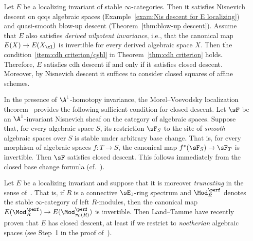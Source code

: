 \begin{exam}\label{exam:cdh=localizing+nil+closed}
Let $E$ be a localizing invariant of stable $\infty$-categories. Then it satisfies Nisnevich descent on qcqs algebraic spaces (Example~\ref{exam:Nis descent for E localizing}) and quasi-smooth blow-up descent (Theorem~\ref{thm:blow-up descent}). Assume that $E$ also satisfies \emph{derived nilpotent invariance}, i.e., that the canonical map $E(X) \to E(X_\cl)$ is invertible for every derived algebraic space $X$. Then the condition~\eqref{item:cdh criterion/qsbl} in Theorem~\ref{thm:cdh criterion} holds. Therefore, $E$ satisfies cdh descent if and only if it satisfies closed descent. Moreover, by Nisnevich descent it suffices to consider closed squares of affine schemes.
\end{exam}

\begin{exam}\label{exam:A1 closed}
In the presence of $\A^1$-homotopy invariance, the Morel--Voevodsky localization theorem~\cite[Theorem~3.2.21]{MorelVoevodsky} provides the following sufficient condition for closed descent. Let $\sF$ be an $\A^1$-invariant Nisnevich sheaf on the category of algebraic spaces. Suppose that, for every algebraic space $S$, its restriction $\sF_S$ to the site of \emph{smooth} algebraic spaces over $S$ is stable under arbitrary base change. That is, for every morphism of algebraic spaces $f : T \to S$, the canonical map $f^*(\sF_S) \to \sF_T$ is invertible. Then $\sF$ satisfies closed descent. This follows immediately from the closed base change formula (cf.~\cite[Proposition~3.3.2]{KhanLocalization}).
\end{exam}

\begin{rema}
Let $E$ be a localizing invariant and suppose that it is moreover \emph{truncating} in the sense of~\cite{LandTamme}. That is, if $R$ is a connective $\sE_1$-ring spectrum and $\Mod_R^\perf$ denotes the stable $\infty$-category of left $R$-modules, then the canonical map $E(\Mod^\perf_R) \to E(\Mod^\perf_{\pi_0(R)})$ is invertible. Then Land--Tamme have recently proven that $E$ has closed descent, at least if we restrict to \emph{noetherian} algebraic spaces (see Step~1 in the proof of~\cite[Theorem.~A.2]{LandTamme}).
\end{rema}

